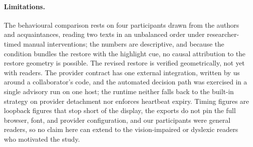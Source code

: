 \paragraph{Limitations.}
The behavioural comparison rests on four participants drawn from the authors and acquaintances, reading two texts in an unbalanced order under researcher-timed manual interventions; the numbers are descriptive, and because the \on{} condition bundles the restore with the highlight cue, no causal attribution to the restore geometry is possible.
The revised restore is verified geometrically, not yet with readers.
The provider contract has one external integration, written by us around a collaborator's code, and the automated decision path was exercised in a single advisory run on one host; the runtime neither falls back to the built-in strategy on provider detachment nor enforces heartbeat expiry.
Timing figures are loopback figures that stop short of the display, the exports do not pin the full browser, font, and provider configuration, and our participants were general readers, so no claim here can extend to the vision-impaired or dyslexic readers who motivated the study.

